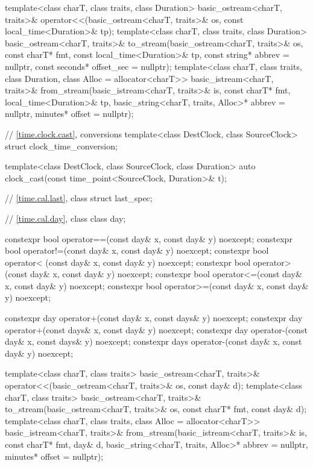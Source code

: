 \begin{codeblock}
{{    template<class charT, class traits, class Duration>
      basic_ostream<charT, traits>&
        operator<<(basic_ostream<charT, traits>& os, const local_time<Duration>& tp);
    template<class charT, class traits, class Duration>
      basic_ostream<charT, traits>&
        to_stream(basic_ostream<charT, traits>& os, const charT* fmt,
                  const local_time<Duration>& tp,
                  const string* abbrev = nullptr, const seconds* offset_sec = nullptr);
    template<class charT, class traits, class Duration, class Alloc = allocator<charT>>
      basic_istream<charT, traits>&
        from_stream(basic_istream<charT, traits>& is, const charT* fmt,
                    local_time<Duration>& tp,
                    basic_string<charT, traits, Alloc>* abbrev = nullptr,
                    minutes* offset = nullptr);

    // \ref{time.clock.cast},  conversions
    template<class DestClock, class SourceClock>
      struct clock_time_conversion;

    template<class DestClock, class SourceClock, class Duration>
      auto clock_cast(const time_point<SourceClock, Duration>& t);

    // \ref{time.cal.last}, class 
    struct last_spec;

    // \ref{time.cal.day}, class 
    class day;

    constexpr bool operator==(const day& x, const day& y) noexcept;
    constexpr bool operator!=(const day& x, const day& y) noexcept;
    constexpr bool operator< (const day& x, const day& y) noexcept;
    constexpr bool operator> (const day& x, const day& y) noexcept;
    constexpr bool operator<=(const day& x, const day& y) noexcept;
    constexpr bool operator>=(const day& x, const day& y) noexcept;

    constexpr day  operator+(const day&  x, const days& y) noexcept;
    constexpr day  operator+(const days& x, const day&  y) noexcept;
    constexpr day  operator-(const day&  x, const days& y) noexcept;
    constexpr days operator-(const day&  x, const day&  y) noexcept;

    template<class charT, class traits>
      basic_ostream<charT, traits>&
        operator<<(basic_ostream<charT, traits>& os, const day& d);
    template<class charT, class traits>
      basic_ostream<charT, traits>&
        to_stream(basic_ostream<charT, traits>& os, const charT* fmt, const day& d);
    template<class charT, class traits, class Alloc = allocator<charT>>
      basic_istream<charT, traits>&
        from_stream(basic_istream<charT, traits>& is, const charT* fmt,
                    day& d, basic_string<charT, traits, Alloc>* abbrev = nullptr,
                    minutes* offset = nullptr);

}}
\end{codeblock}
